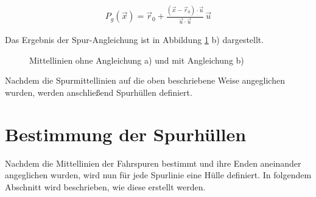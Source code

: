 \begin{ceqn}
\begin{align}
\label{eq_orthPro}
    P_g(\vec x) =  \vec r_0 + \frac{( \vec x - \vec r_0 ) \cdot \vec u}{\vec u \cdot \vec u} \, \vec u
\end{align}
\end{ceqn}

Das Ergebnis der Spur-Angleichung ist in Abbildung \ref{fig:real2_lane_alignment} b) dargestellt.

\begin{figure}[H]
    \centering
    \qquad \qquad
    \caption{Mittellinien ohne Angleichung a) und mit Angleichung b)}
    \label{fig:real2_lane_alignment}
\end{figure}

Nachdem die Spurmittellinien auf die oben beschriebene Weise angeglichen wurden, werden anschließend
Spurhüllen definiert.

\section{Bestimmung der Spurhüllen}
\label{sec:real2_define_lane_envelope}

Nachdem die Mittellinien der Fahrspuren bestimmt und ihre Enden aneinander angeglichen wurden, wird nun für jede Spurlinie
eine Hülle definiert. In folgendem Abschnitt wird beschrieben, wie diese erstellt werden.

